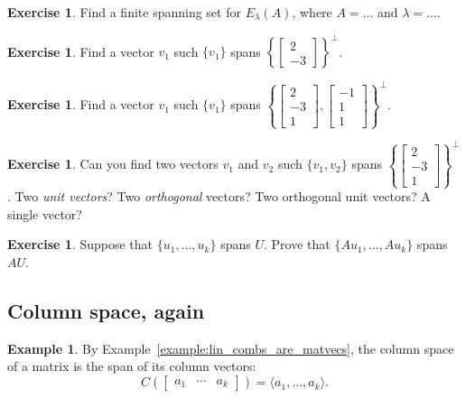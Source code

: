 \documentclass{amsart}
\theoremstyle{definition}
\newtheorem{example}[theorem]{Example}
\newtheorem{exercise}[theorem]{Exercise}
\begin{document}
\begin{exercise}
Find a finite spanning set for $E_\lambda(A)$, where $A=...$ and $\lambda=...$.
\end{exercise}

\begin{exercise}
Find a vector $v_1$ such $\{v_1\}$ spans $\left\{\begin{bmatrix}2\\-3\end{bmatrix}\right\}^\perp$.
\end{exercise}

\begin{exercise}
Find a vector $v_1$ such $\{v_1\}$ spans
$\left\{\begin{bmatrix}2\\-3\\1\end{bmatrix},
  \begin{bmatrix}-1\\1\\1\end{bmatrix}\right\}^\perp$.
  \end{exercise}

\begin{exercise}
Can you find two vectors $v_1$ and $v_2$ such $\{v_1, v_2\}$ spans
$\left\{\begin{bmatrix}2\\-3\\1\end{bmatrix}
  \right\}^\perp$. Two \emph{unit vectors}? Two \emph{orthogonal} vectors? Two orthogonal unit vectors? A single vector?
\end{exercise}

\begin{exercise}
  Suppose that $\{u_1,\ldots,u_k\}$ spans $U$. Prove that $\{Au_1,\ldots,Au_k\}$ spans $AU$.
\end{exercise}

\subsection{Column space, again}
\begin{example}
  By Example~\ref{example:lin_combs_are_matvecs}, the column space of a matrix is the span of its column vectors:
  $$
  C\left(\begin{bmatrix}a_1&\cdots&a_k\end{bmatrix}\right) = \langle a_1,\ldots,a_k \rangle.
  $$
\end{example}
\end{document}
